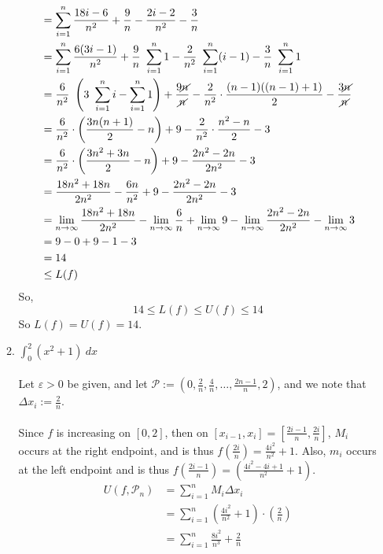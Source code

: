 \documentclass[12pt,letterpaper]{article}
\theoremstyle{case}
\theoremstyle{definition}
\begin{document}
\begin{enumerate}
\begin{enumerate}
\begin{align*}
			 	&= \sum_{i=1}^{n} \frac{18i-6}{n^2} + \frac{9}{n} - \frac{2i-2}{n^2}-\frac{3}{n}\\
			 	&= \sum_{i=1}^{n} \frac{6(3i-1)}{n^2} + \frac{9}{n}\ \sum_{i=1}^{n} 1 - \frac{2}{n^2}\ \sum_{i=1}^{n} (i-1) - \frac{3}{n}\ \sum_{i=1}^{n} 1 \\
			 	&= \frac{6}{n^2}\ \left(3\ \sum_{i=1}^{n} i - \sum_{i=1}^{n} 1\right)+\frac{9\cancel{n}}{\cancel{n}} - \frac{2}{n^2} \cdot \frac{(n-1)((n-1)+1)}{2} -\frac{3\cancel{n}}{\cancel{n}}\\
			 	&= \frac{6}{n^2}\cdot \left(\frac{3n(n+1)}{2}-n\right) + 9 - \frac{2}{n^2} \cdot \frac{n^2-n}{2} - 3\\
			 	&= \frac{6}{n^2} \cdot \left(\frac{3n^2+3n}{2}-n\right) + 9 - \frac{2n^2-2n}{2n^2}-3\\
			 	&= \frac{18n^2+18n}{2n^2} - \frac{6n}{n^2} +9 - \frac{2n^2-2n}{2n^2}-3 \\
			 	&= \lim\limits_{n \to \infty} \frac{18n^2+18n}{2n^2} -\lim\limits_{n \to \infty} \frac{6}{n} + \lim\limits_{n \to \infty} 9 - \lim\limits_{n \to \infty} \frac{2n^2-2n}{2n^2} - \lim\limits_{n \to \infty} 3\\
			 	&= 9-0+9-1-3 \\
			 	&= 14 \\
			 	&\leq L(f)
 			 \end{align*}
 			 So,
 			 \[14 \leq L(f) \leq U(f) \leq 14\]
 			 So $L(f)=U(f)=14$.\\
			\item $\displaystyle\int_{0}^{2} (x^2+1)\ dx$
			\\\\Let $\varepsilon > 0$ be given, and let $\mathcal{P}:= (0, \frac{2}{n}, \frac{4}{n}, \dots, \frac{2n-1}{n}, 2)$, and we note that $\Delta x_i := \frac{2}{n}$.
			\\\\Since $f$ is increasing on $[0,2]$, then on $[x_{i-1},x_i] = \left[\frac{2i-1}{n}, \frac{2i}{n}\right]$, $M_i$ occurs at the right endpoint, and is thus $f\left(\frac{2i}{n}\right)=\frac{4i^2}{n^2}+1$. Also, $m_i$ occurs at the left endpoint and is thus $f\left(\frac{2i-1}{n}\right)=\left(\frac{4i^2-4i+1}{n^2}+1\right)$.
			\begin{align*}
				U(f,\mathcal{P}_n) &= \sum_{i=1}^{n} M_i \Delta x_i \\
				&= \sum_{i=1}^{n} \left(\frac{4i^2}{n^2}+1\right) \cdot \left(\frac{2}{n}\right) \\
				&= \sum_{i=1}^{n} \frac{8i^2}{n^3} + \frac{2}{n} \\

\end{align*}
\end{enumerate}
\end{enumerate}
\end{document}
